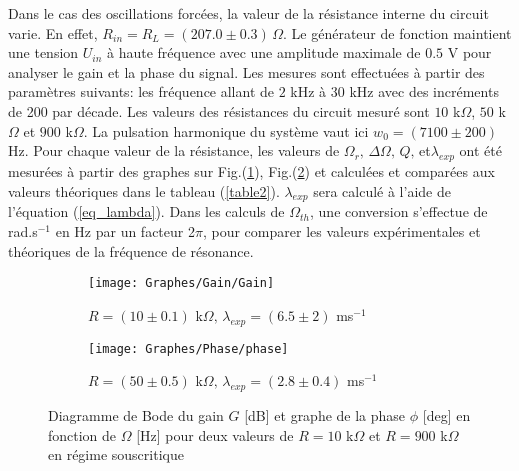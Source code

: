 \documentclass[a4paper, 12pt,oneside]{article}
\begin{document}
Dans le cas des oscillations forcées, la valeur de la résistance interne du circuit varie. En effet, $R_{in}=R_L=(207.0\pm 0.3)\,\Omega$. Le générateur de fonction maintient une tension $U_{in}$ à haute fréquence avec une amplitude maximale de $0.5$ V pour analyser le gain et la phase du signal. Les mesures sont effectuées à partir des paramètres suivants: les fréquence allant de $2$ kHz à $30$ kHz avec des incréments de 200 par décade. Les valeurs des résistances du circuit mesuré sont $10$ k$\Omega$, $50$ k$\Omega$ et $900$ k$\Omega$. La pulsation harmonique du système vaut ici $w_0 = (7100 \pm 200)$ Hz. Pour chaque valeur de la résistance, les valeurs de $\Omega_r,\,\Delta\Omega,\,Q,\,$et$\lambda_{exp}$ ont été mesurées à partir des graphes sur Fig.(\ref{fig5a}), Fig.(\ref{fig5b}) et calculées et comparées aux valeurs théoriques dans le tableau (\ref{table2}). $\lambda_{exp}$ sera calculé à l'aide de l'équation (\ref{eq_lambda}).
Dans les calculs de $\Omega_{th}$, une conversion s'effectue de rad.s$^{-1}$ en Hz par un facteur 2$\pi$, pour comparer les valeurs expérimentales et théoriques de la fréquence de résonance.

\begin{figure}[h]
\centering  %
\begin{subfigure}{0.49\textwidth}  %
    \centering  %
    \texttt{[image: Graphes/Gain/Gain]}
    \captionsetup{justification=centering}
    \caption{$R =(10\pm 0.1)$ k$\Omega,\,\lambda_{exp} = (6.5 \pm 2)$ ms$^{-1}$}
    \label{fig5a}
\end{subfigure}
\begin{subfigure}{0.49\textwidth}  %
    \centering  %
    \texttt{[image: Graphes/Phase/phase]}
    \captionsetup{justification=centering}
    \caption{$R =(50\pm 0.5)$ k$\Omega,\,\lambda_{exp} = (2.8 \pm 0.4)$ ms$^{-1}$}
    \label{fig5b}
\end{subfigure}
\captionsetup{justification=centering}
\caption{Diagramme de Bode du gain $G$ [dB] et graphe de la phase $\phi$ [deg] en fonction de $\Omega$ [Hz] pour deux valeurs de $R = 10$ k$\Omega$ et $R = 900$ k$\Omega$ en régime souscritique}
\label{fig5}
\end{figure}
\end{document}
